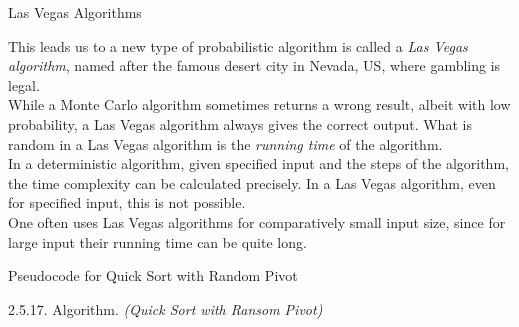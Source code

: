 \documentclass[smaller,hyperref={CJKbookmarks=true}]{beamer}
\newcounter{zhuo}[subsection]
\begin{document}
\begin{frame}[c]{Las Vegas Algorithms}
\begin{spacing}{1.1}
This leads us to a new type of probabilistic algorithm is called a \emph{Las Vegas
algorithm}, named after the famous desert city in Nevada, US, where
gambling is legal.\\[6pt]
While a Monte Carlo algorithm sometimes returns a wrong result, albeit
with low probability, a Las Vegas algorithm always gives the correct
output. What is random in a Las Vegas algorithm is the \emph{running time} of
the algorithm.\\[6pt]
In a deterministic algorithm, given specified input and the steps of the
algorithm, the time complexity can be calculated precisely. In a Las Vegas
algorithm, even for specified input, this is not possible.\\[6pt]
One often uses Las Vegas algorithms for comparatively small input size,
since for large input their running time can be quite long.
\end{spacing}
\end{frame}
\begin{frame}[t]{Pseudocode for Quick Sort with Random Pivot}
\begin{spacing}{1.1}
\alert{2.5.17. Algorithm.} \emph{(Quick Sort with Ransom Pivot)}
\IncMargin{1em}
\begin{algorithm}[H]
\end{algorithm}\DecMargin{1em}
\end{spacing}
\end{frame}
\end{document}
